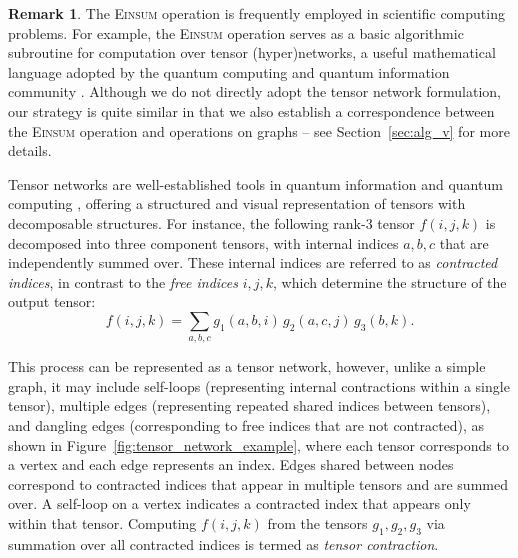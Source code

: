 \documentclass[sn-mathphys, natbib=false]{sn-jnl}
\theoremstyle{plain}
\theoremstyle{definition}
\newtheorem{remark}{Remark}
\def\Einsum{\textsc{Einsum}}
\begin{document}
\begin{bibunit}[agsm]
\begin{remark}
\label{rem:tensor networks}
The \Einsum{} operation is frequently employed in scientific computing problems. For example, the \Einsum{} operation serves as a basic algorithmic subroutine for computation over tensor (hyper)networks, a useful mathematical language adopted by the quantum computing and quantum information community \citep{markov2008simulating}. %
Although we do not directly adopt the tensor network formulation, our strategy is quite similar in that we also establish a correspondence between the \Einsum{} operation and operations on graphs -- see Section~\ref{sec:alg_v} for more details. 
\end{remark}


\iffalse

Tensor networks are well-established tools in quantum information and quantum computing \citep{stoudenmire2018learning}, offering a structured and visual representation of tensors with decomposable structures. For instance, the following rank-3 tensor $f (i, j, k)$ is decomposed into three component tensors, with internal indices $ a, b, c $ that are independently summed over. These internal indices are referred to as \emph{contracted indices}, in contrast to the \emph{free indices} $ i, j, k $, which determine the structure of the output tensor:
\begin{equation*}
    f(i, j, k) = \sum_{a,b,c} g_1(a, b, i)\, g_2(a, c, j)\, g_3(b, k).
\end{equation*}

This process can be represented as a tensor network, however, unlike a simple graph, it may include self-loops (representing internal contractions within a single tensor), multiple edges (representing repeated shared indices between tensors), and dangling edges (corresponding to free indices that are not contracted), as shown in Figure~\ref{fig:tensor_network_example}, where each tensor corresponds to a vertex and each edge represents an index. Edges shared between nodes correspond to contracted indices that appear in multiple tensors and are summed over. A self-loop on a vertex indicates a contracted index that appears only within that tensor. Computing $ f(i, j, k) $ from the tensors $ g_1, g_2, g_3 $ via summation over all contracted indices is termed as \emph{tensor contraction}.


\end{bibunit}
\end{document}
